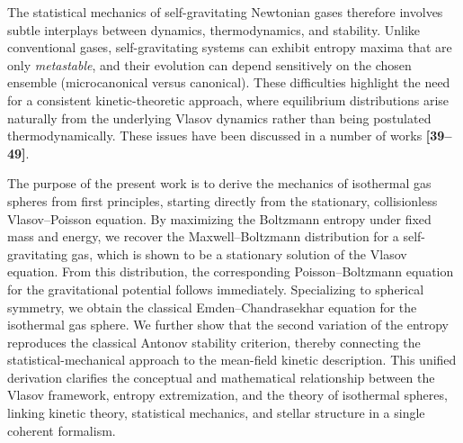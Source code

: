 \documentclass[12pt,a4paper]{article}
\numberwithin{equation}{section}
\begin{document}
The statistical mechanics of self-gravitating Newtonian gases therefore involves subtle interplays between dynamics, thermodynamics, and stability. Unlike conventional gases, self-gravitating systems can exhibit entropy maxima that are only \emph{metastable}, and their evolution can depend sensitively on the chosen ensemble (microcanonical versus
canonical). These difficulties highlight the need for a consistent kinetic-theoretic approach, where equilibrium distributions arise naturally from the underlying Vlasov dynamics rather than being postulated thermodynamically. These issues have been discussed in a number of works \textbf{[39--49]}.

The purpose of the present work is to derive the mechanics of isothermal gas spheres from first principles, starting directly from the stationary, collisionless Vlasov--Poisson equation. By maximizing the Boltzmann entropy under fixed mass and energy, we recover the Maxwell--Boltzmann distribution for a self-gravitating gas, which is shown to be a stationary solution of the Vlasov equation. From this distribution, the corresponding Poisson--Boltzmann equation for the gravitational potential follows immediately. Specializing to spherical symmetry, we obtain the classical Emden--Chandrasekhar equation for the isothermal gas sphere. We further show that the second variation of the entropy reproduces the classical Antonov stability criterion, thereby connecting the statistical-mechanical approach to the mean-field kinetic description. This unified derivation clarifies the conceptual and mathematical relationship between the Vlasov framework, entropy extremization, and the theory of isothermal spheres, linking kinetic theory, statistical mechanics, and stellar structure in a single coherent formalism.
\end{document}
